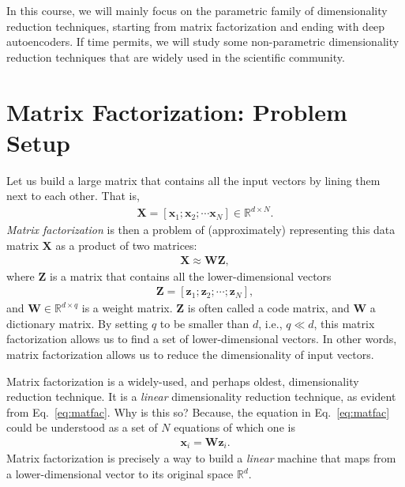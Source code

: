 \documentclass{report}
\newcommand{\vect}[1]{\mathbf{#1}}
\newcommand{\matr}[1]{\mathbf{#1}}
\newcommand{\vx}[0]{\vect{x}}
\newcommand{\vz}[0]{\vect{z}}
\newcommand{\mW}[0]{\matr{W}}
\newcommand{\mZ}[0]{\matr{Z}}
\newcommand{\mX}[0]{\matr{X}}
\newcommand{\RR}[0]{\mathbb{R}}
\begin{document}
In this course, we will mainly focus on the parametric family of dimensionality
reduction techniques, starting from matrix factorization and ending with deep
autoencoders. If time permits, we will study some non-parametric dimensionality
reduction techniques that are widely used in the scientific community.


\section{Matrix Factorization: Problem Setup}

Let us build a large matrix that contains all the input vectors by lining them
next to each other. That is,
\begin{align*}
    \mX = \left[ \vx_1; \vx_2; \cdots \vx_N \right] \in \RR^{d \times N}.
\end{align*}
{\it Matrix factorization} is then a problem of (approximately) representing
this data matrix $\mX$ as a product of two matrices:
\begin{align}
    \label{eq:matfac}
    \mX \approx \mW \mZ,
\end{align}
where $\mZ$ is a matrix that contains all the lower-dimensional vectors
\begin{align*}
    \mZ =\left[ \vz_1; \vz_2; \cdots; \vz_N \right],
\end{align*}
and $\mW \in \RR^{d \times q}$ is a weight matrix. $\mZ$ is often called a code
matrix, and $\mW$ a dictionary matrix.  By setting $q$ to be smaller than $d$,
i.e., $q \ll d$, this matrix factorization allows us to find a set of
lower-dimensional vectors. In other words, matrix factorization allows us to
reduce the dimensionality of input vectors.

Matrix factorization is a widely-used, and perhaps oldest, dimensionality
reduction technique. It is a {\it linear} dimensionality reduction technique, as
evident from Eq.~\eqref{eq:matfac}. Why is this so? Because, the equation in
Eq.~\eqref{eq:matfac} could be understood as a set of $N$ equations of which
one is
\begin{align}
    \label{eq:matfac1}
    \vx_i = \mW \vz_i.
\end{align}
Matrix factorization is precisely a way to build a {\it linear} machine that
maps from a lower-dimensional vector to its original space $\RR^d$. 
\end{document}
